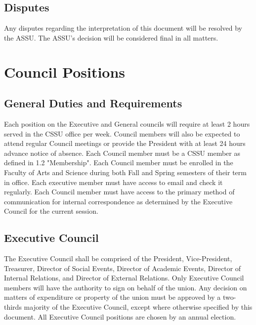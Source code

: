 \documentclass{article}
\begin{document}
\subsection{Disputes }  \label{sec:1.3}
Any disputes regarding the interpretation of this document will be resolved by the ASSU. The ASSU’s decision will be considered final in all matters.

\section{Council Positions} \label{sec:2}
\subsection{General Duties and Requirements }  \label{sec:2.1}
Each position on the Executive and General councils will require at least 2 hours served in the CSSU office per week. Council members will also be expected to attend regular Council meetings or provide the President with at least 24 hours advance notice of absence.
Each Council member must be a CSSU member as defined in 1.2 "Membership". Each Council member must be enrolled in the Faculty of Arts and Science during both Fall and Spring semesters of their term in office.
Each executive member must have access to email and check it regularly. Each Council member must have access to the primary method of communication for internal correspondence as determined by the Executive Council for the current session.
\subsection{Executive Council }  \label{sec:2.2}
The Executive Council shall be comprised of the President, Vice-President, Treasurer, Director of Social Events, Director of Academic Events, Director of Internal Relations, and Director of External Relations. Only Executive Council members will have the authority to sign on behalf of the union. Any decision on matters of expenditure or property of the union must be approved by a two-thirds majority of the Executive Council, except where otherwise specified by this document.
All Executive Council positions are chosen by an annual election.
\end{document}
